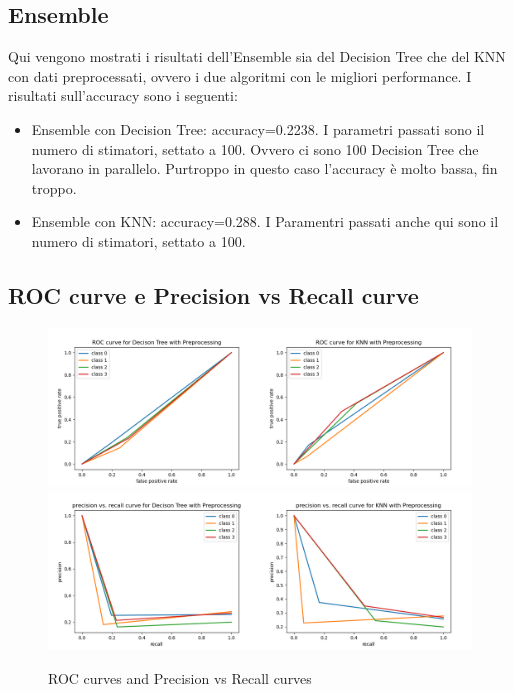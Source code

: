 \subsection{Ensemble}

Qui vengono mostrati i risultati dell'Ensemble sia del Decision Tree che del KNN con dati preprocessati, ovvero i due algoritmi con le migliori performance. I risultati sull'accuracy sono i seguenti:
\begin{itemize}
    \item Ensemble con Decision Tree: accuracy=0.2238. I parametri passati sono il numero di stimatori, settato a 100. Ovvero ci sono 100 Decision Tree che lavorano in parallelo. Purtroppo in questo caso l'accuracy è molto bassa, fin troppo.
    \item Ensemble con KNN: accuracy=0.288. I Paramentri passati anche qui sono il numero di stimatori, settato a 100. 
\end{itemize}

\subsection{ROC curve e Precision vs Recall curve}

   
\begin{figure}[H]
    \centering
    \includegraphics[width=1\columnwidth]{figures/ROC curve DT preprocROC KNN preproc.png}
    \includegraphics[width=1\columnwidth]{figures/DT Precision vs Recall PreprocPrecision vs Recall KNN preproc.png}
    \caption{ROC curves and Precision vs Recall curves}
    \label{fig:Roc curves}
\end{figure}

